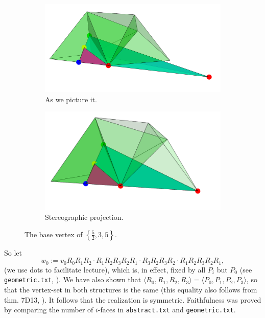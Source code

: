 \documentclass{article}
\theoremstyle{definition}
\begin{document}
		\begin{figure}[H]
		\begin{center}
			\begin{subfigure}{\linewidth}
				\centering
				\includegraphics[width=0.8\linewidth]{fig10a}
				\caption{As we picture it.}\label{fig:10a}
			\end{subfigure}
			\begin{subfigure}{\linewidth}
				\centering
				\includegraphics[width=0.7\linewidth]{fig10b}
				\caption{Stereographic projection.}\label{fig:10b}
			\end{subfigure}
		\end{center}
		\caption{The base vertex of $\left\{\frac{5}{2},3,5\right\}$.}\label{fig:10}
	\end{figure}
	
	So let
		\begin{equation}\label{eq:w0}
			w_0:=v_0R_0R_1R_2\cdot R_1R_2R_3R_2R_1\cdot  R_3R_2R_3R_2\cdot R_1R_2R_3R_2R_1,
		\end{equation}
	(we use dots to facilitate lecture), which is, in effect, fixed by all $P_i$ but $P_0$ (see \texttt{geometric.txt}, ). We have also shown that $\langle R_0,R_1,R_2,R_3\rangle=\langle P_0,P_1,P_2,P_3\rangle$, so that the vertex-set in both structures is the same (this equality also follows from thm. 7D13, \cite{abstract-polytopes}). It follows that the realization is symmetric. Faithfulness was proved by comparing the number of $i$-faces in \texttt{abstract.txt} and \texttt{geometric.txt}.
	
\end{document}
